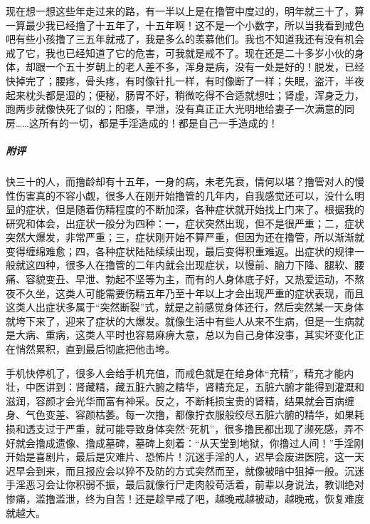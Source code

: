 \begin{case}
    现在想一想这些年走过来的路，有一半以上是在撸管中度过的，明年就三十了，算一算最少我已经撸了十五年了，十五年啊！这不是一个小数字，所以当我看到戒色吧有些小孩撸了三五年就戒了，我是多么的羡慕他们。我也不知道我还有没有机会戒了它，我也已经知道了它的危害，可我就是戒不了。现在还是二十多岁小伙的身体，却跟一个五十岁朝上的老人差不多，浑身是病，没有一处是好的！脱发，已经快掉完了；腰疼，骨头疼，有时像针扎一样，有时像断了一样；失眠，盗汗，半夜起来枕头都是湿的；便秘，肠胃不好，稍微吃得不合适就想吐；肾虚，浑身乏力，跑两步就像快死了似的；阳痿，早泄，没有真正正大光明地给妻子一次满意的同房……这所有的一切，都是手淫造成的！都是自己一手造成的！
    \subparagraph{附评} 快三十的人，而撸龄却有十五年，一身的病，未老先衰，情何以堪？撸管对人的慢性伤害真的不容小觑，很多人在刚开始撸管的几年内，自我感觉还可以，没什么明显的症状，但是随着伤精程度的不断加深，各种症状就开始找上门来了。根据我的研究和体会，出症状一般分为四种：一，症状突然出现，但不是很严重；二，症状突然大爆发，非常严重；三，症状刚开始不算严重，但因为还在撸管，所以渐渐就变得缠绵难愈；四，各种症状陆陆续续出现，最后变得积重难返。出症状的规律一般就这四种，很多人在撸管的二年内就会出现症状，以慢前、脑力下降、腿软、腰痛、容貌变丑、早泄、勃起不坚等为主，而有的人身体底子好，又热爱运动，不熬夜不久坐，这类人可能需要伤精五年乃至十年以上才会出现严重的症状表现，而且这类人出症状多属于“突然断裂”式，就是之前感觉身体还行，然后突然某一天身体就垮下来了，迎来了症状的大爆发。就像生活中有些人从来不生病，但是一生病就是大病、重病，这类人平时也容易麻痹大意，总以为自己身体没事，其实坏变化正在悄然累积，直到最后彻底把他击垮。

    手机快停机了，很多人会给手机充值，而戒色就是在给身体“充精”，精充才能内壮，中医讲到：肾藏精，藏五脏六腑之精华，肾精充足，五脏六腑才能得到灌溉和滋润，容颜才会光华而富有神采。反之，不断耗损宝贵的肾精，结果就会百病缠身、气色变差、容颜枯萎。每一次撸，都像拧衣服般绞尽五脏六腑的精华，如果耗损和透支过于严重，就可能导致身体突然“死机”，很多撸民都出现了濒死感，弄不好就会撸成遗像、撸成墓碑，墓碑上刻着：“从天堂到地狱，你撸过人间！”手淫刚开始是喜剧片，最后是灾难片、恐怖片！沉迷手淫的人，迟早会废进医院，这一天迟早会到来，而且报应会以猝不及防的方式突然而至，就像被暗中狙掉一般。沉迷手淫恶习会让你积弱不振，最后就像行尸走肉般苟活着，前辈以身说法，教训绝对惨痛，滥撸滥泄，终为自苦！还是趁早戒了吧，越晚戒越被动，越晚戒，恢复难度就越大。
\end{case}

